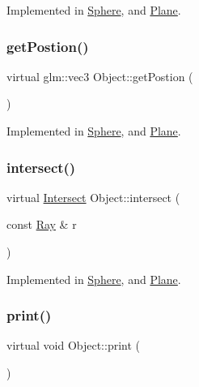Implemented in \mbox{\hyperlink{class_sphere_a0ce51c06baaea1c35129b17b5132ff58}{Sphere}}, and \mbox{\hyperlink{class_plane_a6f2ddd0896e72b7446e2f9acad20c7c3}{Plane}}.

\mbox{\label{class_object_ac29e04a255155b791d69b97820423efa}} 
\subsubsection{\texorpdfstring{get\+Postion()}{getPostion()}}
{\footnotesize\ttfamily virtual glm\+::vec3 Object\+::get\+Postion (\begin{DoxyParamCaption}{ }\end{DoxyParamCaption})\hspace{0.3cm}{\ttfamily [pure virtual]}}



Implemented in \mbox{\hyperlink{class_sphere_a6e2f290f9632e8da3d8dd90dc74997ac}{Sphere}}, and \mbox{\hyperlink{class_plane_a61c43d837a1921039d9b3466d1284741}{Plane}}.

\mbox{\label{class_object_a27b26f69f1fcb4dc72eca40ac0d20ea6}} 
\subsubsection{\texorpdfstring{intersect()}{intersect()}}
{\footnotesize\ttfamily virtual \mbox{\hyperlink{struct_intersect}{Intersect}} Object\+::intersect (\begin{DoxyParamCaption}\item[{const \mbox{\hyperlink{struct_ray}{Ray}} \&}]{r }\end{DoxyParamCaption})\hspace{0.3cm}{\ttfamily [pure virtual]}}



Implemented in \mbox{\hyperlink{class_sphere_a8d2ea6e36b5c23330e08861bb723e2a4}{Sphere}}, and \mbox{\hyperlink{class_plane_a76cf36bbdaaed72e59aa7ecd9dcb9dba}{Plane}}.

\mbox{\label{class_object_ad81452e5a38455eff025d85ef1da7307}} 
\subsubsection{\texorpdfstring{print()}{print()}}
{\footnotesize\ttfamily virtual void Object\+::print (\begin{DoxyParamCaption}{ }\end{DoxyParamCaption})\hspace{0.3cm}{\ttfamily [pure virtual]}}



